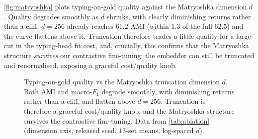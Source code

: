 \autoref{fig:matryoshka} plots typing-on-gold quality against the Matryoshka dimension $d$. Quality degrades smoothly as $d$ shrinks, with clearly diminishing returns rather than a cliff: $d{=}256$ already reaches $61.2$ AMI (within $1.3$ of the full $62.5$) and the curve flattens above it. Truncation therefore trades a little quality for a large cut in the typing-head fit cost, and, crucially, this confirms that the Matryoshka structure \emph{survives} our contrastive fine-tuning: the embedder can still be truncated and renormalised, exposing a graceful cost/quality knob.

\begin{figure}[tp]
\centering
{}
\caption{Typing-on-gold quality vs the Matryoshka truncation dimension $d$. Both AMI and macro-$F_1$ degrade smoothly, with diminishing returns rather than a cliff, and flatten above $d{=}256$. Truncation is therefore a graceful cost/quality knob, and the Matryoshka structure survives the contrastive fine-tuning. Data from \autoref{tab:ablation} (dimension axis, released seed, $13$-set means, log-spaced $d$).}
\label{fig:matryoshka}
\end{figure}

